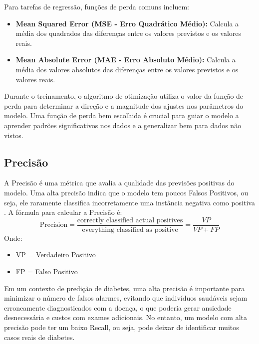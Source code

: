 Para tarefas de regressão, funções de perda comuns incluem:
\begin{itemize}
    \item \textbf{Mean Squared Error (MSE - Erro Quadrático Médio):} Calcula a média dos quadrados das diferenças entre os valores previstos e os valores reais.
    \item \textbf{Mean Absolute Error (MAE - Erro Absoluto Médio):} Calcula a média dos valores absolutos das diferenças entre os valores previstos e os valores reais.
\end{itemize}
Durante o treinamento, o algoritmo de otimização utiliza o valor da função de perda para determinar a direção e a magnitude dos ajustes nos parâmetros do modelo. Uma função de perda bem escolhida é crucial para guiar o modelo a aprender padrões significativos nos dados e a generalizar bem para dados não vistos.

\subsection{Precisão}
A Precisão é uma métrica que avalia a qualidade das previsões positivas do modelo. Uma alta precisão indica que o modelo tem poucos Falsos Positivos, ou seja, ele raramente classifica incorretamente uma instância negativa como positiva \cite{Freitas2024}.
A fórmula para calcular a Precisão é:
$$ \text{Precision} = \frac{\text{correctly classified actual positives}}{\text{everything classified as positive}} = \frac{VP}{VP+FP} $$
Onde:
\begin{itemize}
    \item VP = Verdadeiro Positivo
    \item FP = Falso Positivo
\end{itemize}
Em um contexto de predição de diabetes, uma alta precisão é importante para minimizar o número de falsos alarmes, evitando que indivíduos saudáveis sejam erroneamente diagnosticados com a doença, o que poderia gerar ansiedade desnecessária e custos com exames adicionais. No entanto, um modelo com alta precisão pode ter um baixo Recall, ou seja, pode deixar de identificar muitos casos reais de diabetes.


